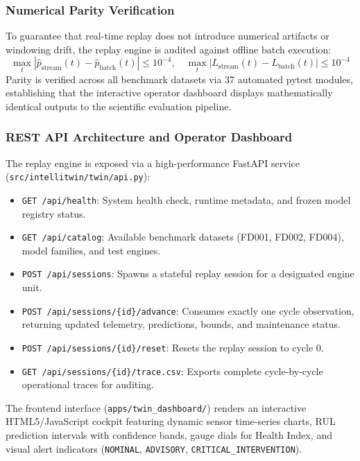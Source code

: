 \documentclass[12pt,a4paper]{article}
\begin{document}
\subsubsection*{Numerical Parity Verification}
To guarantee that real-time replay does not introduce numerical artifacts or windowing drift, the replay engine is audited against offline batch execution:
\begin{equation}
\max_{t} | \hat{p}_{\text{stream}}(t) - \hat{p}_{\text{batch}}(t) | \le 10^{-4}, \quad \max_{t} | L_{\text{stream}}(t) - L_{\text{batch}}(t) | \le 10^{-4}
\end{equation}
Parity is verified across all benchmark datasets via 37 automated pytest modules, establishing that the interactive operator dashboard displays mathematically identical outputs to the scientific evaluation pipeline.

\subsubsection*{REST API Architecture and Operator Dashboard}
The replay engine is exposed via a high-performance FastAPI service (\texttt{src/intellitwin/twin/api.py}):
\begin{itemize}
    \item \texttt{GET /api/health}: System health check, runtime metadata, and frozen model registry status.
    \item \texttt{GET /api/catalog}: Available benchmark datasets (FD001, FD002, FD004), model families, and test engines.
    \item \texttt{POST /api/sessions}: Spawns a stateful replay session for a designated engine unit.
    \item \texttt{POST /api/sessions/\{id\}/advance}: Consumes exactly one cycle observation, returning updated telemetry, predictions, bounds, and maintenance status.
    \item \texttt{POST /api/sessions/\{id\}/reset}: Resets the replay session to cycle 0.
    \item \texttt{GET /api/sessions/\{id\}/trace.csv}: Exports complete cycle-by-cycle operational traces for auditing.
\end{itemize}
The frontend interface (\texttt{apps/twin_dashboard/}) renders an interactive HTML5/JavaScript cockpit featuring dynamic sensor time-series charts, RUL prediction intervals with confidence bands, gauge dials for Health Index, and visual alert indicators (\texttt{NOMINAL}, \texttt{ADVISORY}, \texttt{CRITICAL\_INTERVENTION}).
\end{document}
